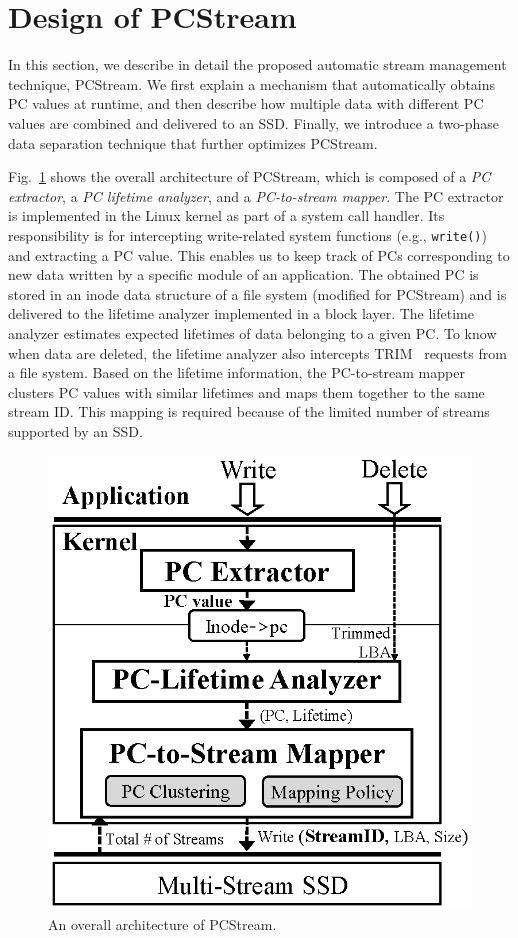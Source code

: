 \section{Design of PCStream}
In this section, we describe in detail the proposed automatic stream management
technique, {\sf PCStream}.  We first explain a mechanism that automatically
obtains PC values at runtime, and then describe how multiple data with
different PC values are combined and delivered to an SSD. Finally, we introduce
a two-phase data separation technique that further optimizes {\sf PCStream}.


Fig.~\ref{fig:architecture} shows the overall architecture of {\sf PCStream},
which is composed of a \textit{PC extractor}, a \textit{PC lifetime analyzer},
and a \textit{PC-to-stream mapper}.  The PC extractor is implemented in the
Linux kernel as part of a system call handler. Its responsibility is for
intercepting write-related system functions (e.g., \texttt{write()}) and extracting
a PC value.  This enables us to keep track of PCs corresponding to new data
written by a specific module of an application.  The obtained PC is stored in
an inode data structure of a file system (modified for \textsf{PCStream}) and
is delivered to the lifetime analyzer implemented in a block layer.  The
lifetime analyzer estimates expected lifetimes of data belonging to a given PC.
To know when data are deleted, the lifetime analyzer also intercepts TRIM~\cite{TRIM}
requests from a file system.  Based on the lifetime information, the
PC-to-stream mapper clusters PC values with similar lifetimes and maps them
together to the same stream ID.  This mapping is required because of the
limited number of streams supported by an SSD.

\begin{figure}[t]
	\centering
	\includegraphics[width=0.6\linewidth]{figure/architecture4}
	\vspace{-10pt}
	\caption{An overall architecture of {\sf PCStream}.}
	\label{fig:architecture}
	\vspace{-15pt}
\end{figure}

